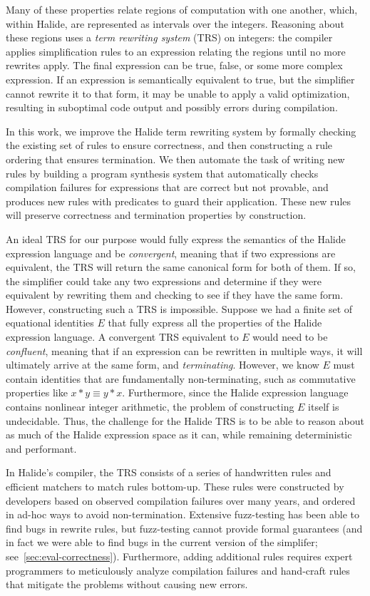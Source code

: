 \documentclass[sigplan,10pt,review,anonymous]{acmart}\settopmatter{printfolios=true,printccs=false,printacmref=false}
\begin{document}
Many of these properties relate regions of computation with one another,
which, within Halide, are represented as intervals over the integers.
Reasoning about these regions uses a \textit{term rewriting system}
(TRS) on integers: the compiler applies simplification rules to an expression relating
the regions until no more rewrites apply.  The final expression can be
true, false, or some more complex expression. If an expression is semantically equivalent to true,
but the simplifier cannot rewrite it to that form, it may be unable to apply a valid optimization,
resulting in suboptimal code output and possibly errors during compilation.

In this work, we improve the Halide term rewriting system by formally checking the existing
set of rules to ensure correctness, and then constructing a rule ordering that 
ensures termination.  We then automate the task of writing new rules by building a program
synthesis system that automatically checks compilation failures for expressions that are
correct but not provable, and produces new rules with predicates to guard their application.
These new rules will preserve correctness and termination properties by construction.

An ideal TRS for our purpose would fully express the semantics of the Halide expression language and be \emph{convergent}, meaning that if two expressions are equivalent,
the TRS will return the same canonical form for both of them. If so, the simplifier could take any two expressions and determine if they were equivalent by rewriting them and checking to see if they have the same form. However, constructing such a TRS is impossible. Suppose we had a finite set of equational identities $E$ that fully express all the properties of the Halide expression language. A convergent TRS equivalent to $E$ would need to be \emph{confluent}, meaning that if an expression can be rewritten in multiple ways, it will ultimately arrive at the same form, and \emph{terminating}. However, we know $E$ must contain identities that are fundamentally non-terminating, such as commutative properties like $x * y \equiv y * x$. Furthermore, since the Halide expression language contains nonlinear integer arithmetic, the problem of constructing $E$ itself is undecidable. Thus, the challenge for the Halide TRS is to be able to reason about as much of the Halide expression space as it can, while remaining deterministic and performant.

In Halide's compiler, the TRS consists of a series of
handwritten rules and efficient matchers to match rules bottom-up.  These rules were constructed
by developers based on observed compilation failures over many years, and ordered in ad-hoc ways
to avoid non-termination.  Extensive fuzz-testing has been able to find bugs in rewrite rules,
but fuzz-testing cannot provide formal guarantees (and in fact we were able to find bugs in the current version of the simplifer; see~\ref{sec:eval-correctness}). Furthermore, adding additional
rules requires expert programmers to meticulously analyze compilation failures and hand-craft
rules that mitigate the problems without causing new errors.
\end{document}
